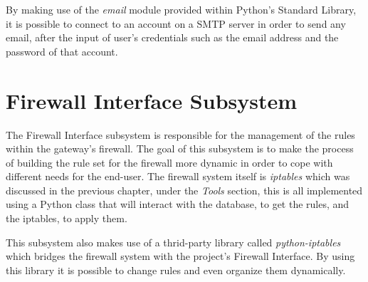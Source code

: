 \begin{enumerate}
By making use of the \emph{email} module provided within Python's Standard
Library, it is possible to connect to an account on a SMTP server in order to
send any email, after the input of user's credentials such as the email address
and the password of that account.





\section{Firewall Interface Subsystem}
\label{chap4:sec:firewall-sys}
The Firewall Interface subsystem is responsible for the management of the rules
within the gateway's firewall. The goal of this subsystem is to make the process
of building the rule set for the firewall more dynamic in order to cope with
different needs for the end-user. The firewall system itself is \emph{iptables}
which was discussed in the previous chapter, under the \emph{Tools} section,
this is all implemented using a Python class that will interact with the
database, to get the rules, and the iptables, to apply them.

This subsystem also makes use of a thrid-party library called
\emph{python-iptables} which bridges the firewall system with the project's
Firewall Interface. By using this library it is possible to change rules and
even organize them dynamically.


\end{enumerate}
